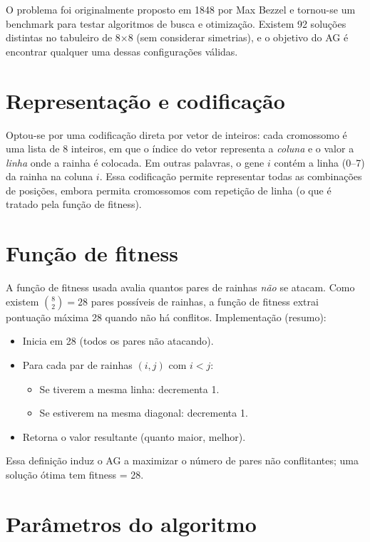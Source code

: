 \documentclass[a4paper,12pt]{article}
\begin{document}
O problema foi originalmente proposto em 1848 por Max Bezzel e tornou-se um benchmark para testar algoritmos de busca e otimização. Existem 92 soluções distintas no tabuleiro de 8×8 (sem considerar simetrias), e o objetivo do AG é encontrar qualquer uma dessas configurações válidas.

\section{Representação e codificação}
\label{ch:representacao}

Optou-se por uma codificação direta por vetor de inteiros: cada cromossomo é uma lista de 8 inteiros, em que o índice do vetor representa a \emph{coluna} e o valor a \emph{linha} onde a rainha é colocada. Em outras palavras, o gene \(i\) contém a linha (0--7) da rainha na coluna \(i\). Essa codificação permite representar todas as combinações de posições, embora permita cromossomos com repetição de linha (o que é tratado pela função de fitness).

\section{Função de fitness}
\label{sec:funcao_fitness}

A função de fitness usada avalia quantos pares de rainhas \emph{não} se atacam. Como existem \(\binom{8}{2}=28\) pares possíveis de rainhas, a função de fitness extrai pontuação máxima 28 quando não há conflitos. Implementação (resumo):

\begin{itemize}
  \item Inicia em 28 (todos os pares não atacando).
  \item Para cada par de rainhas \((i,j)\) com \(i<j\):
    \begin{itemize}
      \item Se tiverem a mesma linha: decrementa 1.
      \item Se estiverem na mesma diagonal: decrementa 1.
    \end{itemize}
  \item Retorna o valor resultante (quanto maior, melhor).
\end{itemize}

Essa definição induz o AG a maximizar o número de pares não conflitantes; uma solução ótima tem fitness = 28.

\section{Parâmetros do algoritmo}
\label{sec:parametros}
\end{document}
